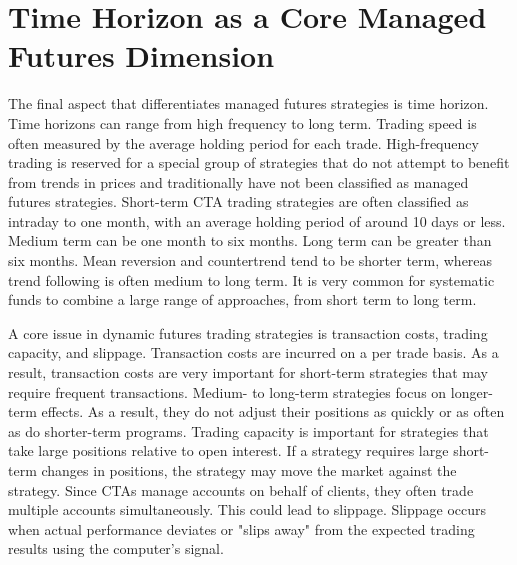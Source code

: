 \documentclass[11pt]{article}
\begin{document}
\section*{Time Horizon as a Core Managed Futures Dimension}
The final aspect that differentiates managed futures strategies is time horizon. Time horizons can range from high frequency to long term. Trading speed is often measured by the average holding period for each trade. High-frequency trading is reserved for a special group of strategies that do not attempt to benefit from trends in prices and traditionally have not been classified as managed futures strategies. Short-term CTA trading strategies are often classified as intraday to one month, with an average holding period of around 10 days or less. Medium term can be one month to six months. Long term can be greater than six months. Mean reversion and countertrend tend to be shorter term, whereas trend following is often medium to long term. It is very common for systematic funds to combine a large range of approaches, from short term to long term.

A core issue in dynamic futures trading strategies is transaction costs, trading capacity, and slippage. Transaction costs are incurred on a per trade basis. As a result, transaction costs are very important for short-term strategies that may require frequent transactions. Medium- to long-term strategies focus on longer-term effects. As a result, they do not adjust their positions as quickly or as often as do shorter-term programs. Trading capacity is important for strategies that take large positions relative to open interest. If a strategy requires large short-term changes in positions, the strategy may move the market against the strategy. Since CTAs manage accounts on behalf of clients, they often trade multiple accounts simultaneously. This could lead to slippage. Slippage occurs when actual performance deviates or "slips away" from the expected trading results using the computer's signal.
\end{document}
